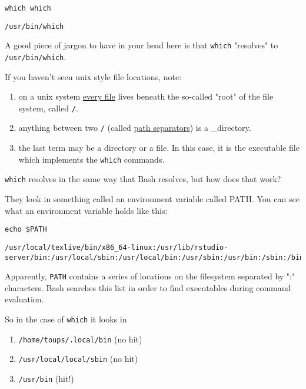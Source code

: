 \documentclass[11pt]{article}
\begin{document}
\begin{verbatim}
which which
\end{verbatim}

\begin{verbatim}
/usr/bin/which
\end{verbatim}


A good piece of jargon to have in your head here is that \texttt{which}
"resolves" to \texttt{/usr/bin/which}.

If you haven't seen unix style file locations, note:

\begin{enumerate}
\item on a unix system \uline{every file} lives beneath the so-called "root" of
the file system, called \texttt{/}.
\item anything between two \texttt{/} (called \uline{path separators}) is a
\_directory.
\item the last term may be a directory or a file. In this case, it is the
executable file which implements the \texttt{which} commands.
\end{enumerate}

\texttt{which} resolves in the same way that Bash resolves, but how does that
work?

They look  in something called an environment variable called
PATH. You can see what an environment variable holds like this:

\begin{verbatim}
echo $PATH
\end{verbatim}

\begin{verbatim}
/usr/local/texlive/bin/x86_64-linux:/usr/lib/rstudio-server/bin:/usr/local/sbin:/usr/local/bin:/usr/sbin:/usr/bin:/sbin:/bin
\end{verbatim}

Apparently, \texttt{PATH} contains a series of locations on the filesystem
separated by ":" characters. Bash searches this list in order to find
executables during command evaluation.

So in the case of \texttt{which} it looks in 

\begin{enumerate}
\item \texttt{/home/toups/.local/bin} (no hit)
\item \texttt{/usr/local/local/sbin} (no hit)
\item \texttt{/usr/bin} (hit!)
\end{enumerate}
\end{document}
